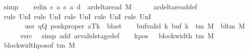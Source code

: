 \begin{isabellebody}
\ simp\isanewline
\ \ \isamarkupfalse%
\ rel{\isacharunderscore}{\kern0pt}in{\isacharcolon}{\kern0pt}\ {\isachardoublequoteopen}{\isacharparenleft}{\kern0pt}{\isacharquery}{\kern0pt}s{\isacharcomma}{\kern0pt}\ {\isacharquery}{\kern0pt}a{\isacharcomma}{\kern0pt}\ {\isacharquery}{\kern0pt}s{\isacharprime}{\kern0pt}{\isacharcomma}{\kern0pt}\ {\isacharquery}{\kern0pt}a{\isacharcomma}{\kern0pt}\ {\isacharquery}{\kern0pt}d{\isacharparenright}{\kern0pt}\ {\isasymin}\ ar{\isacharunderscore}{\kern0pt}delta{\isacharunderscore}{\kern0pt}read\ M{\isachardoublequoteclose}\isanewline
\ \ \ \ \isamarkupfalse%
\ ar{\isacharunderscore}{\kern0pt}delta{\isacharunderscore}{\kern0pt}read{\isacharunderscore}{\kern0pt}def\isanewline
\ \ \ \ \isamarkupfalse%
\ {\isacharparenleft}{\kern0pt}rule\ UnI{}{\isacharcomma}{\kern0pt}\ rule\ UnI{}{\isacharcomma}{\kern0pt}\ rule\ UnI{}{\isacharcomma}{\kern0pt}\ rule\ UnI{}{\isacharcomma}{\kern0pt}\ rule\ UnI{}{\isacharparenright}{\kern0pt}\isanewline
\ \ \ \ \ \ \ {\isacharparenleft}{\kern0pt}use\ qQ\ posk{\isacharunderscore}{\kern0pt}proper\ aTk\ \ blast{\isacharparenright}{\kern0pt}\isanewline
\ \ \isamarkupfalse%
\ buf{\isacharunderscore}{\kern0pt}valid{\isacharcolon}{\kern0pt}\ {\isachardoublequoteopen}{\isasymforall}k{\isachardot}{\kern0pt}\ buf\ k\ {\isasymin}\ {\isasymGamma}{\isacharunderscore}{\kern0pt}tm\ M\ {\isasymunion}\ {\isacharbraceleft}{\kern0pt}bl{\isacharunderscore}{\kern0pt}tm\ M{\isacharbraceright}{\kern0pt}{\isachardoublequoteclose}\isanewline
\ \ \ \ \isamarkupfalse%
\ vsrc\ \isamarkupfalse%
\ {\isacharparenleft}{\kern0pt}simp\ add{\isacharcolon}{\kern0pt}\ ar{\isacharunderscore}{\kern0pt}valid{\isacharunderscore}{\kern0pt}stage{\isacharunderscore}{\kern0pt}def{\isacharparenright}{\kern0pt}\isanewline
\ \ \isamarkupfalse%
\ kpos{\isacharcolon}{\kern0pt}\ {\isachardoublequoteopen}{}\ {\isacharless}{\kern0pt}\ block{\isacharunderscore}{\kern0pt}width\ {\isacharparenleft}{\kern0pt}{\isasymGamma}{\isacharunderscore}{\kern0pt}tm\ M{\isacharparenright}{\kern0pt}{\isachardoublequoteclose}\ \isamarkupfalse%
\ block{\isacharunderscore}{\kern0pt}width{\isacharunderscore}{\kern0pt}pos{\isacharbrackleft}{\kern0pt}of\ {\isachardoublequoteopen}{\isasymGamma}{\isacharunderscore}{\kern0pt}tm\ M{\isachardoublequoteclose}{\isacharbrackright}{\kern0pt}\ \isamarkupfalse%

\end{isabellebody}
